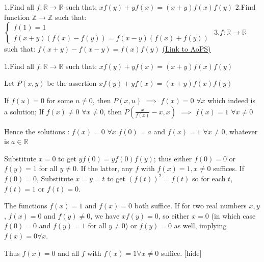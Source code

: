 \begin{problem}
	1.Find all $f:\mathbb{R}\rightarrow \mathbb{R}$ such that:
$xf(y)+yf(x)=(x+y)f(x)f(y)$
2.Find function $\mathbb{Z}\rightarrow \mathbb{Z}$ such that:
$\left\{\begin{matrix}
 f(1)=1 \\ 
 f(x+y)(f(x)-f(y))=f(x-y)(f(x)+f(y))
\end{matrix}\right.$
3.$f:\mathbb{R}\rightarrow \mathbb{R}$ such that:
$f(x+y)-f(x-y)=f(x)f(y)$
	\flushright \href{https://artofproblemsolving.com/community/c6h535058}{(Link to AoPS)}
\end{problem}



\begin{solution}
	\begin{tcolorbox}1.Find all $f:\mathbb{R}\rightarrow \mathbb{R}$ such that:
$xf(y)+yf(x)=(x+y)f(x)f(y)$\end{tcolorbox}
Let $P(x,y)$ be the assertion $xf(y)+yf(x)=(x+y)f(x)f(y)$

If $f(u)=0$ for some $u\ne 0$, then $P(x,u)$ $\implies$ $f(x)=0$ $\forall x$ which indeed is a solution;
If $f(x)\ne 0$ $\forall x\ne 0$, then $P(\frac x{f(x)}-x,x)$ $\implies$ $f(x)=1$ $\forall x\ne 0$

Hence the solutions :
$f(x)=0$ $\forall x$
$f(0)=a$ and $f(x)=1$ $\forall x\ne 0$, whatever is $a\in\mathbb R$
\end{solution}



\begin{solution}
Substitute $x=0$ to get $yf(0)=yf(0)f(y)$; thus either $f(0)=0$ or $f(y)=1$ for all $y\neq 0$. If the latter, any $f$ with $f(x)=1,x\neq 0$ suffices. If $f(0)=0$, Substitute $x=y=t$ to get $(f(t))^2=f(t)$ so for each $t$, $f(t)=1$ or $f(t)=0$.

The functions $f(x)=1$ and $f(x)=0$ both suffice. If for two real numbers $x,y$, $f(x)=0$ and $f(y) \neq 0$, we have $xf(y)=0$, so either $x=0$ (in which case $f(0)=0$ and $f(y)=1$ for all $y\neq 0$) or $f(y)=0$ as well, implying $f(x)=0 \forall x$.

Thus $f(x)=0$ and all $f$ with $f(x)=1 \forall x\neq 0$ suffice.
[\/hide]
\end{solution}



